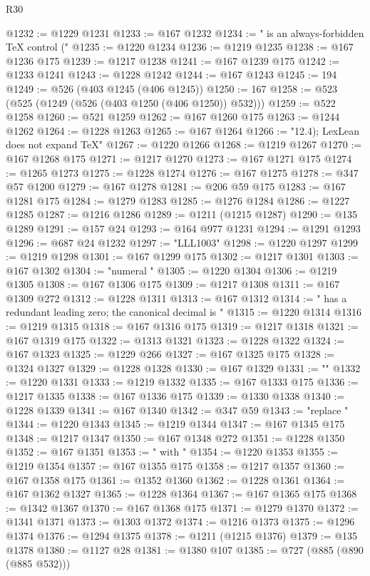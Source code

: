 \begin{lexlean}{R30}
\begin{coremodule}
@1232 := @1229 @1231
@1233 := @167 @1232
@1234 := " is an always-forbidden TeX control ("
@1235 := @1220 @1234
@1236 := @1219 @1235
@1238 := @167 @1236 @175
@1239 := @1217 @1238
@1241 := @167 @1239 @175
@1242 := @1233 @1241
@1243 := @1228 @1242
@1244 := @167 @1243
@1245 := 194
@1249 := @526 (@403 @1245 (@406 @1245))
@1250 := 167
@1258 := @523 (@525 (@1249 (@526 (@403 @1250 (@406 @1250)) @532)))
@1259 := @522 @1258
@1260 := @521 @1259
@1262 := @167 @1260 @175
@1263 := @1244 @1262
@1264 := @1228 @1263
@1265 := @167 @1264
@1266 := "12.4); LexLean does not expand TeX"
@1267 := @1220 @1266
@1268 := @1219 @1267
@1270 := @167 @1268 @175
@1271 := @1217 @1270
@1273 := @167 @1271 @175
@1274 := @1265 @1273
@1275 := @1228 @1274
@1276 := @167 @1275
@1278 := @347 @57 @1200
@1279 := @167 @1278
@1281 := @206 @59 @175
@1283 := @167 @1281 @175
@1284 := @1279 @1283
@1285 := @1276 @1284
@1286 := @1227 @1285
@1287 := @1216 @1286
@1289 := @1211 (@1215 @1287)
@1290 := @135 @1289
@1291 := @157 @24
@1293 := @164 @977 @1231
@1294 := @1291 @1293
@1296 := @687 @24 @1232
@1297 := "LLL1003"
@1298 := @1220 @1297
@1299 := @1219 @1298
@1301 := @167 @1299 @175
@1302 := @1217 @1301
@1303 := @167 @1302
@1304 := "numeral "
@1305 := @1220 @1304
@1306 := @1219 @1305
@1308 := @167 @1306 @175
@1309 := @1217 @1308
@1311 := @167 @1309 @272
@1312 := @1228 @1311
@1313 := @167 @1312
@1314 := " has a redundant leading zero; the canonical decimal is "
@1315 := @1220 @1314
@1316 := @1219 @1315
@1318 := @167 @1316 @175
@1319 := @1217 @1318
@1321 := @167 @1319 @175
@1322 := @1313 @1321
@1323 := @1228 @1322
@1324 := @167 @1323
@1325 := @1229 @266
@1327 := @167 @1325 @175
@1328 := @1324 @1327
@1329 := @1228 @1328
@1330 := @167 @1329
@1331 := ""
@1332 := @1220 @1331
@1333 := @1219 @1332
@1335 := @167 @1333 @175
@1336 := @1217 @1335
@1338 := @167 @1336 @175
@1339 := @1330 @1338
@1340 := @1228 @1339
@1341 := @167 @1340
@1342 := @347 @59
@1343 := "replace "
@1344 := @1220 @1343
@1345 := @1219 @1344
@1347 := @167 @1345 @175
@1348 := @1217 @1347
@1350 := @167 @1348 @272
@1351 := @1228 @1350
@1352 := @167 @1351
@1353 := " with "
@1354 := @1220 @1353
@1355 := @1219 @1354
@1357 := @167 @1355 @175
@1358 := @1217 @1357
@1360 := @167 @1358 @175
@1361 := @1352 @1360
@1362 := @1228 @1361
@1364 := @167 @1362 @1327
@1365 := @1228 @1364
@1367 := @167 @1365 @175
@1368 := @1342 @1367
@1370 := @167 @1368 @175
@1371 := @1279 @1370
@1372 := @1341 @1371
@1373 := @1303 @1372
@1374 := @1216 @1373
@1375 := @1296 @1374
@1376 := @1294 @1375
@1378 := @1211 (@1215 @1376)
@1379 := @135 @1378
@1380 := @1127 @28
@1381 := @1380 @107
@1385 := @727 (@885 (@890 (@885 @532)))

\end{coremodule}
\end{lexlean}
